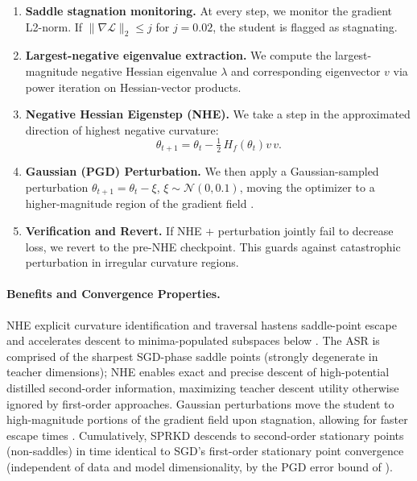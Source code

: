 \documentclass[letterpaper]{article}
\begin{document}
\begin{enumerate}
\item \textbf{Saddle stagnation monitoring.} At every step, we monitor the gradient L2-norm. If $\|\nabla \mathcal{L}\|_2 \leq j$ for $j = 0.02$, the student is flagged as stagnating.
\item \textbf{Largest-negative eigenvalue extraction.} We compute the largest-magnitude negative Hessian eigenvalue $\lambda$ and corresponding eigenvector $v$ via power iteration on Hessian-vector products.
\item \textbf{Negative Hessian Eigenstep (NHE).} We take a step in the approximated direction of highest negative curvature:
\begin{equation}
\theta_{t+1} = \theta_t - \tfrac{1}{2} \, H_f(\theta_t) v \, v.
\end{equation}
\item \textbf{Gaussian (PGD) Perturbation.} We then apply a Gaussian-sampled perturbation $\theta_{t+1} = \theta_t - \xi$, $\xi \sim \mathcal{N}(0, 0.1)$, moving the optimizer to a higher-magnitude region of the gradient field \citep{jin2017escape}.
\item \textbf{Verification and Revert.} If NHE + perturbation jointly fail to decrease loss, we revert to the pre-NHE checkpoint. This guards against catastrophic perturbation in irregular curvature regions.
\end{enumerate}

\paragraph{Benefits and Convergence Properties.}
NHE explicit curvature identification and traversal hastens saddle-point escape and accelerates descent to minima-populated subspaces below \citep{alain2019negative}. The ASR is comprised of the sharpest SGD-phase saddle points (strongly degenerate in teacher dimensions); NHE enables exact and precise descent of high-potential distilled second-order information, maximizing teacher descent utility otherwise ignored by first-order approaches. Gaussian perturbations move the student to high-magnitude portions of the gradient field upon stagnation, allowing for faster escape times \citep{jin2017escape}. Cumulatively, SPRKD descends to second-order stationary points (non-saddles) in time identical to SGD's first-order stationary point convergence (independent of data and model dimensionality, by the PGD error bound of \citet{jin2017escape}).
\end{document}

